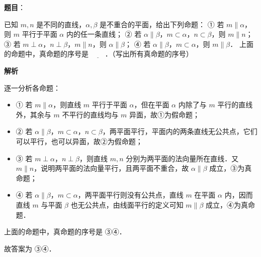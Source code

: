 \begin{answer}

\textbf{题目}：

已知 $m, n$ 是不同的直线，$\alpha, \beta$ 是不重合的平面，给出下列命题：
① 若 $m \parallel \alpha$，则 $m$ 平行于平面 $\alpha$ 内的任一条直线；
② 若 $\alpha \parallel \beta$，$m \subset \alpha$，$n \subset \beta$，则 $m \parallel n$；
③ 若 $m \perp \alpha$，$n \perp \beta$，$m \parallel n$，则 $\alpha \parallel \beta$；
④ 若 $\alpha \parallel \beta$，$m \subset \alpha$，则 $m \parallel \beta$．
上面的命题中，真命题的序号是 $\underline{\hspace{2em}}$．（写出所有真命题的序号）

\textbf{解析}

逐一分析各命题：
\begin{itemize}
\item ① 若 $m \parallel \alpha$，则直线 $m$ 平行于平面 $\alpha$，但在平面 $\alpha$ 内除了与 $m$ 平行的直线外，其余与 $m$ 不平行的直线均与 $m$ 异面，故①为假命题；
\item ② 若 $\alpha \parallel \beta$，$m \subset \alpha$，$n \subset \beta$，两平面平行，平面内的两条直线无公共点，它们可以平行，也可以异面，故②为假命题；
\item ③ 若 $m \perp \alpha$，$n \perp \beta$，则直线 $m, n$ 分别为两平面的法向量所在直线．又 $m \parallel n$，说明两平面的法向量平行，且两平面不重合，故 $\alpha \parallel \beta$ 成立，③为真命题；
\item ④ 若 $\alpha \parallel \beta$，$m \subset \alpha$，两平面平行则没有公共点，直线 $m$ 在平面 $\alpha$ 内，因而直线 $m$ 与平面 $\beta$ 也无公共点，由线面平行的定义可知 $m \parallel \beta$ 成立，④为真命题．
\end{itemize}

上面的命题中，真命题的序号是 ③④．

故答案为 ③④．


\end{answer}
